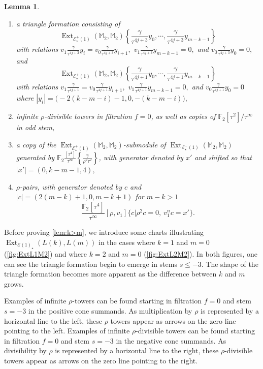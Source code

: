 \documentclass{amsart}
\newtheorem{lemma}[equation]{Lemma}
\theoremstyle{plain}
\numberwithin{equation}{section}
\numberwithin{figure}{section}
\DeclareMathOperator{\Ext}{Ext}
\newcommand{\mF}{{\mathbb F}}
\newcommand{\mM}{{\mathbb M}}
\newcommand{\cE}{{\mathcal E}}
\newcommand{\0}{\langle 0 \rangle }
\begin{document}
\begin{lemma}
\begin{enumerate} 
\item a triangle formation consisting of \label{classes:negative triangle}
\[ 
\Ext_{\cE^{+}_{\star}(1)}\left(\mM_{2}, \mM_{2}\right) \left\{ \frac{\gamma}{\tau^{4j + 3}}y_0, \cdots, \frac{\gamma}{\tau^{4j + 3}}y_{m-k-1} \right\} 
\]
with relations $v_{1}\frac{\gamma}{\tau^{4j + 3}}y_{i} = v_{0}\frac{\gamma}{\tau^{4j + 3}}y_{i+1},$ $v_{1}\frac{\gamma}{\tau^{4j + 3}}y_{m-k-1} = 0,$ and $v_{0}\frac{\gamma}{\tau^{4j + 3}}y_{0} = 0,$ and 
\[
\Ext_{\cE^{+}_{\star}(1)}\left(\mM_{2}, \mM_{2}\right) \left\{ \frac{\gamma}{\tau^{4j + 1}}y_0, \cdots, \frac{\gamma}{\tau^{4j + 1}}y_{m-k-1} \right\}
\]
with relations $v_{1}\frac{\gamma}{\tau^{4j + 1}} = v_{0}\frac{\gamma}{\tau^{4j + 1}}y_{i+1},$ $v_{1}\frac{\gamma}{\tau^{4j + 1}}y_{m-k-1} = 0,$ and $v_{0}\frac{\gamma}{\tau^{4j + 1}}y_{0} = 0$ where $|y_{i}| = \big(-2(k-m - i)-1, 0, -(k-m - i)\big),$ 
\item infinite $\rho$-divisible towers in filtration $f = 0$, as well as copies of $\mF_{2}[\tau^{2}]/\tau^{\infty}$ in odd stem,
\item a copy of the $\Ext_{\cE^{+}_{\star}(1)}(\mM_{2}, \mM_{2})$-submodule of $\Ext_{\cE^{-}_{\star}(1)}(\mM_{2}, \mM_{2})$ generated by \newline $\mF_{2}\frac{[\tau^{4}]}{\tau^{\infty}} \left\{ \frac{\gamma}{\rho^{2}\tau^{2}} \right\}$, with generator denoted by $x'$ and shifted so that $|x'| = (0, k-m-1, 4),$ 
\item $\rho$-pairs, with generator denoted by $c$ and $|c| = (2(m-k) +1, 0, m-k + 1)$ for $m-k > 1$
\[
\frac{\mF_2[\tau^4]}{\tau^\infty}[\rho, v_{1}]\{c | \rho^{2}c = 0,\ v_1^nc = x'\}.
\]
\end{enumerate}
\end{lemma}


Before proving \cref{lem:k>m}, we introduce some charts illustrating $\Ext_{\cE(1)_\star} (L(k), L(m))$ in the cases where $k = 1$ and $m = 0$ (\cref{fig:ExtL1M2}) and where $k =2$ and $m = 0$ (\cref{fig:ExtL2M2}). In both figures, one can see the triangle formation begin to emerge in stems $s \leq -3$. The shape of the triangle formation becomes more apparent as the difference between $k$ and $m$ grows. 

Examples of infinite $\rho$-towers can be found starting in filtration $f = 0$ and stem $s = -3$ in the positive cone summands. As multiplication by $\rho$ is represented by a horizontal line to the left, these $\rho$ towers appear as arrows on the zero line pointing to the left. Examples of infinite $\rho$-divisible towers can be found starting in filtration $f = 0$ and stem $s = -3$ in the negative cone summands. As divisibility by $\rho$ is represented by a horizontal line to the right, these $\rho$-divisible towers appear as arrows on the zero line pointing to the right. 
\end{document}

